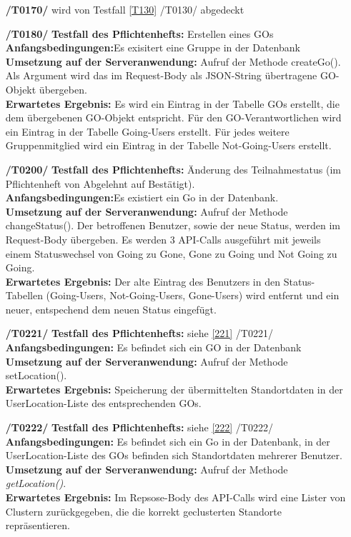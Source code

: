 \documentclass[11pt,a4paper]{scrartcl}
\begin{document}
\begin{enumerate}
	\item[\textbf{/T0170/}] wird von Testfall \ref{T130} /T0130/ abgedeckt
	
	\item[\textbf{/T0180/}]
	\textbf{Testfall des Pflichtenhefts: }Erstellen eines GOs\\
	\textbf{Anfangsbedingungen:}Es exisitert eine Gruppe in der Datenbank\\
	\textbf{Umsetzung auf der Serveranwendung: }Aufruf der Methode createGo(). Als Argument wird das im Request-Body als JSON-String übertragene GO-Objekt übergeben.\\
	\textbf{Erwartetes Ergebnis: }Es wird ein Eintrag in der Tabelle GOs erstellt, die dem übergebenen GO-Objekt entspricht. Für den GO-Verantwortlichen wird ein Eintrag in der Tabelle Going-Users erstellt. Für jedes weitere Gruppenmitglied wird ein Eintrag in der Tabelle Not-Going-Users erstellt.
	
	\item[\textbf{/T0200/}]
	\textbf{Testfall des Pflichtenhefts: }Änderung des Teilnahmestatus (im Pflichtenheft von Abgelehnt auf Bestätigt).\\
	\textbf{Anfangsbedingungen:}Es existiert ein Go in der Datenbank.\\
	\textbf{Umsetzung auf der Serveranwendung: }Aufruf der Methode changeStatus(). Der betroffenen Benutzer, sowie der neue Status, werden im Request-Body übergeben. Es werden 3 API-Calls ausgeführt mit jeweils einem Statuswechsel von Going zu Gone, Gone zu Going und Not Going zu Going.\\
	\textbf{Erwartetes Ergebnis: }Der alte Eintrag des Benutzers in den Status-Tabellen (Going-Users, Not-Going-Users, Gone-Users) wird entfernt und ein neuer, entspechend dem neuen Status eingefügt.
	
	\item[\textbf{/T0221/}]
	\textbf{Testfall des Pflichtenhefts: }siehe \ref{221} /T0221/\\
	\textbf{Anfangsbedingungen: }Es befindet sich ein GO in der Datenbank\\
	\textbf{Umsetzung auf der Serveranwendung: }Aufruf der Methode setLocation().\\
	\textbf{Erwartetes Ergebnis: }Speicherung der übermittelten Standortdaten in der UserLocation-Liste des entsprechenden GOs.
	
	\item[\textbf{/T0222/}]
	\textbf{Testfall des Pflichtenhefts: }siehe \ref{222} /T0222/\\
	\textbf{Anfangsbedingungen: }Es befindet sich ein Go in der Datenbank, in der UserLocation-Liste des GOs befinden sich Standortdaten mehrerer Benutzer.\\
	\textbf{Umsetzung auf der Serveranwendung: }Aufruf der Methode \textit{getLocation()}.\\
	\textbf{Erwartetes Ergebnis: }Im Repsose-Body des API-Calls wird eine Lister von Clustern zurückgegeben, die die korrekt geclusterten Standorte repräsentieren.
	

\end{enumerate}
\end{document}

